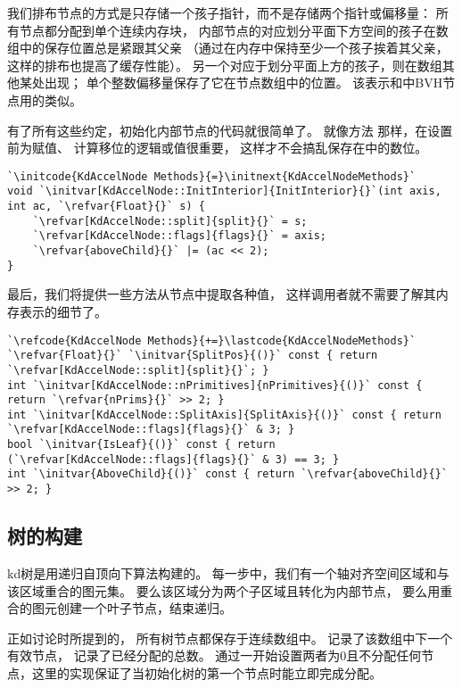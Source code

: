 我们排布节点的方式是只存储一个孩子指针，而不是存储两个指针或偏移量：
所有节点都分配到单个连续内存块，
内部节点的对应划分平面下方空间的孩子在数组中的保存位置总是紧跟其父亲
（通过在内存中保持至少一个孩子挨着其父亲，这样的排布也提高了缓存性能）。
另一个对应于划分平面上方的孩子，则在数组其他某处出现；
单个整数偏移量保存了它在节点数组中的位置。
该表示和中BVH节点用的类似。

有了所有这些约定，初始化内部节点的代码就很简单了。
就像方法
那样，在设置前为赋值、
计算移位的逻辑或值很重要，
这样才不会搞乱保存在中的数位。
\begin{lstlisting}
`\initcode{KdAccelNode Methods}{=}\initnext{KdAccelNodeMethods}`
void `\initvar[KdAccelNode::InitInterior]{InitInterior}{}`(int axis, int ac, `\refvar{Float}{}` s) {
    `\refvar[KdAccelNode::split]{split}{}` = s;
    `\refvar[KdAccelNode::flags]{flags}{}` = axis;
    `\refvar{aboveChild}{}` |= (ac << 2);
}
\end{lstlisting}

最后，我们将提供一些方法从节点中提取各种值，
这样调用者就不需要了解其内存表示的细节了。
\begin{lstlisting}
`\refcode{KdAccelNode Methods}{+=}\lastcode{KdAccelNodeMethods}`
`\refvar{Float}{}` `\initvar{SplitPos}{()}` const { return `\refvar[KdAccelNode::split]{split}{}`; }
int `\initvar[KdAccelNode::nPrimitives]{nPrimitives}{()}` const { return `\refvar{nPrims}{}` >> 2; }
int `\initvar[KdAccelNode::SplitAxis]{SplitAxis}{()}` const { return `\refvar[KdAccelNode::flags]{flags}{}` & 3; }
bool `\initvar{IsLeaf}{()}` const { return (`\refvar[KdAccelNode::flags]{flags}{}` & 3) == 3; }
int `\initvar{AboveChild}{()}` const { return `\refvar{aboveChild}{}` >> 2; }
\end{lstlisting}

\subsection{树的构建}\label{sub:树的构建}
kd树是用递归自顶向下算法构建的。
每一步中，我们有一个轴对齐空间区域和与该区域重合的图元集。
要么该区域分为两个子区域且转化为内部节点，
要么用重合的图元创建一个叶子节点，结束递归。

正如讨论时所提到的，
所有树节点都保存于连续数组中。\newline
{}记录了该数组中下一个有效节点，
记录了已经分配的总数。
通过一开始设置两者为0且不分配任何节点，这里的实现保证了当初始化树的第一个节点时能立即完成分配。

